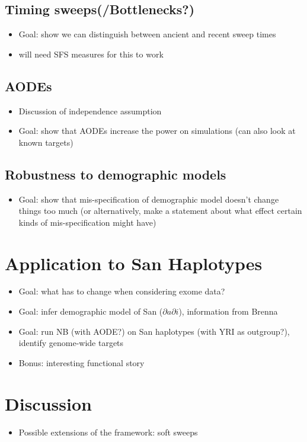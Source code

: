 \documentclass{article}
\begin{document}
\subsection{Timing sweeps(/Bottlenecks?)}
\begin{itemize}
\item Goal: show we can distinguish between ancient and recent sweep times
\item will need SFS measures for this to work
\end{itemize}
\bigskip

\subsection{AODEs}
\begin{itemize}
\item Discussion of independence assumption
\item Goal: show that AODEs increase the power on simulations (can also look at known targets)
\end{itemize}
\bigskip

\subsection{Robustness to demographic models}
\begin{itemize}
\item Goal: show that mis-specification of demographic model doesn't change things too much (or alternatively, make a statement about what effect certain kinds of mis-specification might have)
\end{itemize}
\bigskip

\section{Application to San Haplotypes}
\begin{itemize}
\item Goal: what has to change when considering exome data?
\item Goal: infer demographic model of San  ($\partial a \partial i$), information from Brenna
\item Goal: run NB (with AODE?) on San haplotypes (with YRI as outgroup?), identify genome-wide targets
\item Bonus: interesting functional story
\end{itemize}
\bigskip

\section{Discussion}
\begin{itemize}
\item Possible extensions of the framework: soft sweeps
\end{itemize}
\end{document}
